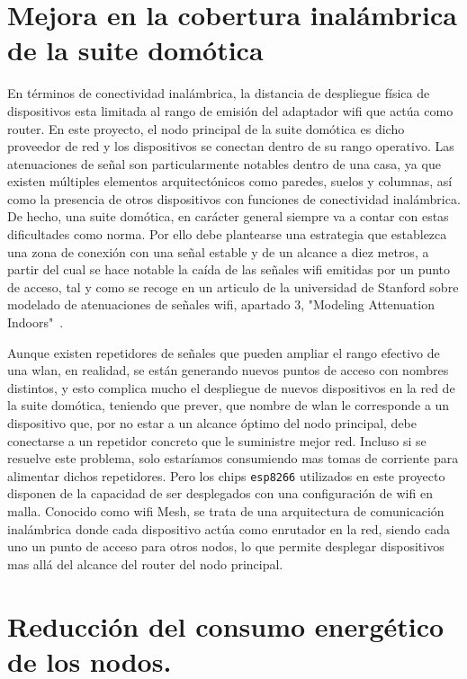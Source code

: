 \section{Mejora en la cobertura inalámbrica de la suite domótica}
\label{ch:Capitulo6.2}

En términos de conectividad inalámbrica, la distancia de despliegue física de dispositivos esta limitada al rango de emisión del adaptador \gls{wifi} que actúa como router. En este proyecto, el nodo principal de la suite domótica es dicho proveedor de red y los dispositivos se conectan dentro de su rango operativo. Las atenuaciones de señal son particularmente notables dentro de una casa, ya que existen múltiples elementos arquitectónicos como paredes, suelos y columnas, así como la presencia de otros dispositivos con funciones de conectividad inalámbrica. De hecho, una suite domótica, en carácter general siempre va a contar con estas dificultades como norma. Por ello debe plantearse una estrategia que establezca una zona de conexión con una señal estable y de un alcance a diez metros, a partir del cual se hace notable la caída de las señales \gls{wifi} emitidas por un punto de acceso, tal y como se recoge en un articulo de la universidad de Stanford sobre modelado de atenuaciones de señales \gls{wifi}, apartado 3, "Modeling Attenuation Indoors"~\cite{faria2005modeling}.

\vspace{1cm}

Aunque existen repetidores de señales que pueden ampliar el rango efectivo de una \gls{wlan}, en realidad, se están generando nuevos puntos de acceso con nombres distintos, y esto complica mucho el despliegue de nuevos dispositivos en la red de la suite domótica, teniendo que prever, que nombre de \gls{wlan} le corresponde a un dispositivo que, por no estar a un alcance óptimo del nodo principal, debe conectarse a un repetidor concreto que le suministre mejor red. Incluso si se resuelve este problema, solo estaríamos consumiendo mas tomas de corriente para alimentar dichos repetidores. Pero los chips \verb|esp8266| utilizados en este proyecto disponen de la capacidad de ser desplegados con una configuración de \gls{wifi} en malla. Conocido como \gls{wifi} Mesh, se trata de una arquitectura de comunicación inalámbrica donde cada dispositivo actúa como enrutador en la red, siendo cada uno un punto de acceso para otros nodos, lo que permite desplegar dispositivos mas allá del alcance del router del nodo principal.

\section{Reducción del consumo energético de los nodos.}
\label{ch:Capitulo6.3}


